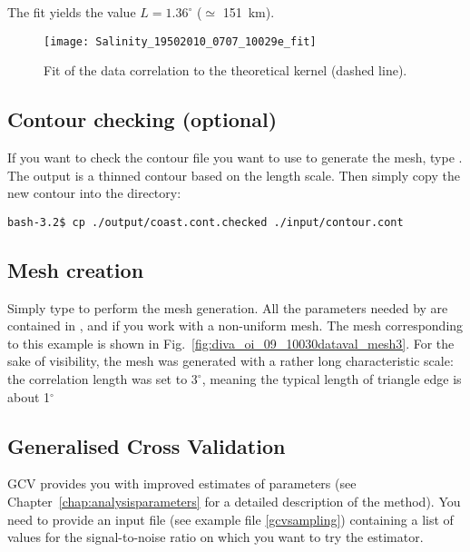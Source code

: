 The fit yields the value $L=1.36^{\circ}$ ($\simeq$ 151~km).

\begin{figure}[h!]
\centering
\texttt{[image: Salinity\_19502010\_0707\_10029e\_fit]}
\caption[Fit of the data correlation to the theoretical kernel.]{Fit of the data correlation to the theoretical kernel (dashed line). \label{fig:Salinity_19502010_0707_10029e_fit}}
\end{figure}



\subsection[Contour checking]{Contour checking (optional)}

If you want to check the contour file you want to use to generate the mesh, type . The output  is a thinned contour based on the length scale.
Then simply copy the new contour into the  directory:

\begin{lstlisting}[style=Bash]
bash-3.2$ cp ./output/coast.cont.checked ./input/contour.cont
\end{lstlisting}


\subsection{Mesh creation}

Simply type  to perform the mesh generation. All the parameters needed by \diva are contained in ,  and  if you work with a non-uniform mesh.
The mesh corresponding to this example is shown in Fig.~\ref{fig:diva_oi_09_10030dataval_mesh3}. For the sake of visibility, the mesh was generated with a rather long characteristic scale: the correlation length was set to $3^{\circ}$, meaning the typical length of triangle edge is about 1$^{\circ}$


\subsection{Generalised Cross Validation}

GCV provides you with improved estimates of parameters (see Chapter~\ref{chap:analysisparameters} for a detailed description of the method). You need to provide an input file  (see example file \ref{gcvsampling}) containing a list of values for the signal-to-noise ratio on which you want to try the estimator.

